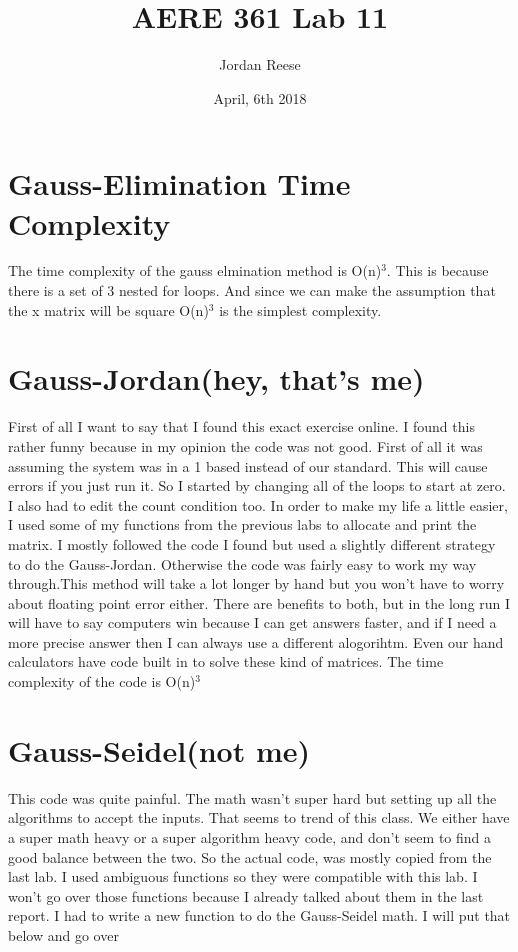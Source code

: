 \documentclass{article} \usepackage[utf8]{inputenc} \title{AERE 361 Lab 11} \author{Jordan Reese} \date{April, 6th 2018} \usepackage{listings} \usepackage{color} \definecolor{dkgreen}{rgb}{0,0.6,0}
\begin{document}
 \maketitle \section*{Gauss-Elimination Time Complexity} The time complexity of the gauss elmination method is O(n)$^3$. This is because there is a set of 3 nested for loops. And since we can make the assumption 
that the x matrix will be square O(n)$^3$ is the simplest complexity. \section*{Gauss-Jordan(hey, that's me)} \indent First of all I want to say that I found this exact exercise online. I found this rather funny because in my 
opinion the code was not good. First of all it was assuming the system was in a 1 based instead of our standard. This will cause errors if you just run it. So I started by changing all of the loops to start at zero. I also had to 
edit the count condition too. In order to make my life a little easier, I used some of my functions from the previous labs to allocate and print the matrix. I mostly followed the code I found but used a slightly different 
strategy to do the Gauss-Jordan. Otherwise the code was fairly easy to work my way through.\newline \indent This method will take a lot longer by hand but you won't have to worry about floating point error either. There are 
benefits to both, but in the long run I will have to say computers win because I can get answers faster, and if I need a more precise answer then I can always use a different alogorihtm. Even our hand calculators have code built 
in to solve these kind of matrices. The time complexity of the code is O(n)$^3$ \section*{Gauss-Seidel(not me)} This code was quite painful. The math wasn't super hard but setting up all the algorithms to accept the inputs. That 
seems to trend of this class. We either have a super math heavy or a super algorithm heavy code, and don't seem to find a good balance between the two. So the actual code, was mostly copied from the last lab. I used ambiguous 
functions so they were compatible with this lab. I won't go over those functions because I already talked about them in the last report. I had to write a new function to do the Gauss-Seidel math. I will put that below and go over 
\end{document}
